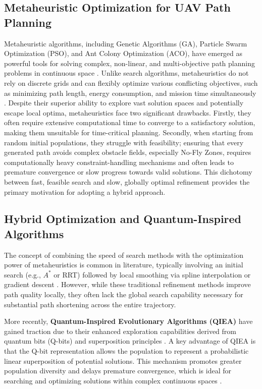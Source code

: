 \subsection{Metaheuristic Optimization for UAV Path Planning}
Metaheuristic algorithms, including Genetic Algorithms (GA), Particle Swarm Optimization (PSO), and Ant Colony Optimization (ACO), have emerged as powerful tools for solving complex, non-linear, and multi-objective path planning problems in continuous space \cite{ref12}. Unlike search algorithms, metaheuristics do not rely on discrete grids and can flexibly optimize various conflicting objectives, such as minimizing path length, energy consumption, and mission time simultaneously \cite{ref13}. Despite their superior ability to explore vast solution spaces and potentially escape local optima, metaheuristics face two significant drawbacks. Firstly, they often require extensive computational time to converge to a satisfactory solution, making them unsuitable for time-critical planning. Secondly, when starting from random initial populations, they struggle with feasibility; ensuring that every generated path avoids complex obstacle fields, especially No-Fly Zones, requires computationally heavy constraint-handling mechanisms and often leads to premature convergence or slow progress towards valid solutions. This dichotomy between fast, feasible search and slow, globally optimal refinement provides the primary motivation for adopting a hybrid approach.

\subsection{Hybrid Optimization and Quantum-Inspired Algorithms}

The concept of combining the speed of search methods with the optimization power of metaheuristics is common in literature, typically involving an initial search (e.g., $A^{*}$ or RRT) followed by local smoothing via spline interpolation or gradient descent \cite{ref8}. However, while these traditional refinement methods improve path quality locally, they often lack the global search capability necessary for substantial path shortening across the entire trajectory.

More recently, \textbf{Quantum-Inspired Evolutionary Algorithms (QIEA)} have gained traction due to their enhanced exploration capabilities derived from quantum bits (Q-bits) and superposition principles \cite{ref10}. A key advantage of QIEA is that the Q-bit representation allows the population to represent a probabilistic linear superposition of potential solutions. This mechanism promotes greater population diversity and delays premature convergence, which is ideal for searching and optimizing solutions within complex continuous spaces \cite{ref14}.

